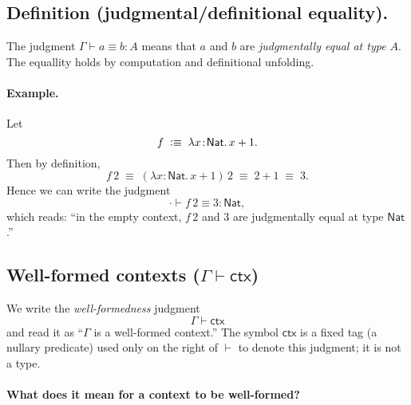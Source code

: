 \documentclass{article}
\newcommand{\defeq}{\vcentcolon\equiv}
\newcommand{\Nat}{\mathsf{Nat}}
\newcommand{\Bool}{\mathsf{Bool}}
\newcommand{\emptyctx}{\cdot}              %
\newcommand{\ctx}{\mathsf{ctx}}            %
\newcommand{\judg}[3]{#1 \vdash #2 : #3}   %
\newcommand{\jdeq}{\equiv}                 %
\newcommand{\teq}[4]{#1 \vdash #2 \jdeq #3 : #4} %
\newcommand{\rulename}[1]{\textsc{#1}}
\begin{document}

\subsection*{Definition (judgmental/definitional equality).}
The judgment \(\teq{\Gamma}{a}{b}{A}\) means that
\(a\) and \(b\) are \emph{judgmentally equal at type \(A\)}. The equallity holds by computation and definitional unfolding.

\paragraph{Example.}
Let
\[
f \;\defeq\; \lambda x\!:\!\Nat.\, x + 1.
\]
Then by definition,
\[
f\,2 \;\jdeq\; (\lambda x\!:\!\Nat.\,x + 1)\,2 \;\jdeq\; 2 + 1 \;\jdeq\; 3.
\]
Hence we can write the judgment
\[
\judg{\emptyctx}{f\,2 \jdeq 3}{\Nat},
\]
which reads: “in the empty context, \(f\,2\) and \(3\) are judgmentally equal at type \(\Nat\).”

\subsection*{Well-formed contexts \texorpdfstring{(\(\Gamma \vdash \ctx\))}{(Gamma |- ctx)}}

We write the \emph{well-formedness} judgment
\[
\Gamma \vdash \ctx
\]
and read it as “\(\Gamma\) is a well-formed context.” The symbol \(\ctx\) is a
fixed tag (a nullary predicate) used only on the right of \(\vdash\) to denote
this judgment; it is not a type.

\paragraph{What does it mean for a context to be well-formed?}
\end{document}
